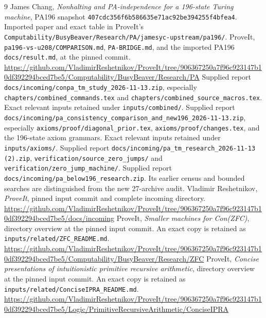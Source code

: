 \documentclass[11pt,letterpaper]{article}
\newcommand{\file}[1]{\texttt{\nolinkurl{#1}}}
\begin{document}
\begin{thebibliography}{9}
 James Chang, \emph{Nonhalting and PA-independence for a
196-state Turing machine}, PA196 snapshot
\file{407cdc356f6b586635e71ac92be394255f4bfea4}. Imported paper and exact
table in ProveIt's \file{Computability/BusyBeaver/Research/PA/jamesyc-upstream/pa196/}.
 ProveIt, \file{pa196-vs-u208/COMPARISON.md},
\file{PA-BRIDGE.md}, and the imported PA196 \file{docs/result.md},
at the pinned commit.\newline
\url{https://github.com/VladimirReshetnikov/ProveIt/tree/906367250a7f96c923147b10df392294bced7be5/Computability/BusyBeaver/Research/PA}
 Supplied report
\file{docs/incoming/conpa_tm_study_2026-11-13.zip}, especially
\file{chapters/combined_commands.tex} and
\file{chapters/combined_source_macros.tex}. Exact relevant inputs retained
under \file{inputs/combined/}.
 Supplied report
\file{docs/incoming/pa_consistency_comparison_and_new196_2026-11-13.zip},
especially \file{axioms/proof/diagonal_prior.tex},
\file{axioms/proof/changes.tex}, and the 196-state axiom grammars.
Exact relevant inputs retained under \file{inputs/axioms/}.
 Supplied report
\file{docs/incoming/pa_tm_research_2026-11-13 (2).zip},
\file{verification/source_zero_jumps/} and
\file{verification/zero_jump_machine/}.
 Supplied report
\file{docs/incoming/pa_below196_research.zip}. Its earlier census and
bounded searches are distinguished from the new 27-archive audit.
 Vladimir Reshetnikov, \emph{ProveIt}, pinned input
commit and complete incoming directory.\newline
\url{https://github.com/VladimirReshetnikov/ProveIt/tree/906367250a7f96c923147b10df392294bced7be5/docs/incoming}
 ProveIt, \emph{Smaller machines for Con(ZFC)},
directory overview at the pinned input commit. An exact copy is retained
as \file{inputs/related/ZFC_README.md}.\newline
\url{https://github.com/VladimirReshetnikov/ProveIt/tree/906367250a7f96c923147b10df392294bced7be5/Computability/BusyBeaver/Research/ZFC}
 ProveIt, \emph{Concise presentations of intuitionistic
primitive recursive arithmetic}, directory overview at the pinned input
commit. An exact copy is retained as
\file{inputs/related/ConciseIPRA_README.md}.\newline
\url{https://github.com/VladimirReshetnikov/ProveIt/tree/906367250a7f96c923147b10df392294bced7be5/Logic/PrimitiveRecursiveArithmetic/ConciseIPRA}
\end{thebibliography}
\end{document}
